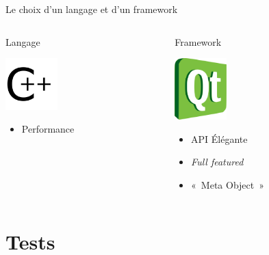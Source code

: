 \documentclass[frenchb]{beamer}
\begin{document}
\begin{frame}{Le choix d'un langage et d'un framework}
    \pause
    \begin{columns}
        \begin{column}[l]{5cm}
            \begin{block}{Langage}
            \begin{center}
                \includegraphics[width=2cm]{../img/ps/C_plus_plus.pdf}
            \end{center}
            \begin{itemize}
                \item Performance
            \end{itemize}
            \end{block}
        \end{column}
        \pause
        \begin{column}[r]{5cm}
            \begin{block}{Framework}
            \begin{center}
                \includegraphics[width=2cm]{../img/ps/Qt.pdf}
            \end{center}
            \begin{itemize}
                \item API Élégante
                \item \textit{Full featured}
                \item «~Meta Object~»
            \end{itemize}
            \end{block}
        \end{column}
    \end{columns}
\end{frame}

\section{Tests}
\end{document}
